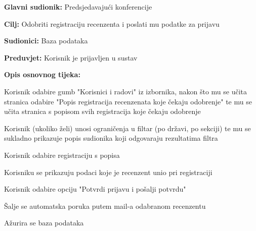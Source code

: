 					\noindent {}
					\begin{packed_item}
	
						\item \textbf{Glavni sudionik: } Predsjedavajući konferencije
						\item  \textbf{Cilj:} Odobriti registraciju recenzenta i poslati mu podatke za prijavu
						\item  \textbf{Sudionici:} Baza podataka
						\item  \textbf{Preduvjet:} Korisnik je prijavljen u sustav
						\item  \textbf{Opis osnovnog tijeka:}
						
						\item[] \begin{packed_enum}
	
							\item Korisnik odabire gumb "Korisnici i radovi" iz izbornika, nakon što mu se učita stranica odabire "Popis registracija recenzenata koje čekaju odobrenje" te mu se učita stranica s popisom svih registracija koje čekaju odobrenje
							\item Korisnik (ukoliko želi) unosi ograničenja u filtar (po državi, po sekciji) te mu se sukladno prikazuje popis sudionika koji odgovaraju rezultatima filtra
							\item Korisnik odabire registraciju s popisa
							\item Korisniku se prikazuju podaci koje je recenzent unio pri registraciji
							\item Korisnik odabire opciju "Potvrdi prijavu i pošalji potvrdu"
							\item Šalje se automatska poruka putem mail-a odabranom recenzentu
							\item Ažurira se baza podataka

					
						\end{packed_enum}
			
					\end{packed_item}

